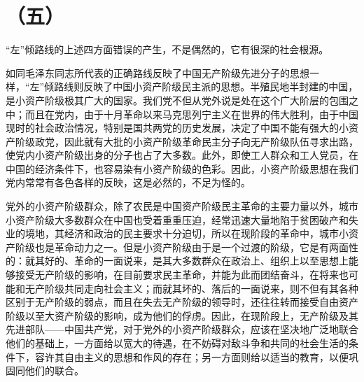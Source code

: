 \section*{（五）}

“左”倾路线的上述四方面错误的产生，不是偶然的，它有很深的社会根源。

如同毛泽东同志所代表的正确路线反映了中国无产阶级先进分子的思想一样，“左”倾路线则反映了中国小资产阶级民主派的思想。半殖民地半封建的中国，是小资产阶级极其广大的国家。我们党不但从党外说是处在这个广大阶层的包围之中；而且在党内，由于十月革命以来马克思列宁主义在世界的伟大胜利，由于中国现时的社会政治情况，特别是国共两党的历史发展，决定了中国不能有强大的小资产阶级政党，因此就有大批的小资产阶级革命民主分子向无产阶级队伍寻求出路，使党内小资产阶级出身的分子也占了大多数。此外，即使工人群众和工人党员，在中国的经济条件下，也容易染有小资产阶级的色彩。因此，小资产阶级思想在我们党内常常有各色各样的反映，这是必然的，不足为怪的。

党外的小资产阶级群众，除了农民是中国资产阶级民主革命的主要力量以外，城市小资产阶级大多数群众在中国也受着重重压迫，经常迅速大量地陷于贫困破产和失业的境地，其经济和政治的民主要求十分迫切，所以在现阶段的革命中，城市小资产阶级也是革命动力之一。但是小资产阶级由于是一个过渡的阶级，它是有两面性的：就其好的、革命的一面说来，是其大多数群众在政治上、组织上以至思想上能够接受无产阶级的影响，在目前要求民主革命，并能为此而团结奋斗，在将来也可能和无产阶级共同走向社会主义；而就其坏的、落后的一面说来，则不但有其各种区别于无产阶级的弱点，而且在失去无产阶级的领导时，还往往转而接受自由资产阶级以至大资产阶级的影响，成为他们的俘虏。因此，在现阶段上，无产阶级及其先进部队——中国共产党，对于党外的小资产阶级群众，应该在坚决地广泛地联合他们的基础上，一方面给以宽大的待遇，在不妨碍对敌斗争和共同的社会生活的条件下，容许其自由主义的思想和作风的存在；另一方面则给以适当的教育，以便巩固同他们的联合。

